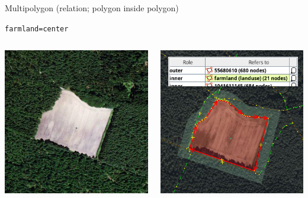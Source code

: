 \documentclass{beamer}
\begin{document}
			\begin{frame}{Multipolygon (relation; polygon inside polygon)}
				\begin{center}
					\texttt{farmland=center}
					\vspace{0.5cm}
					\begin{columns}
						\begin{column}{4cm}
							\includegraphics[width=\linewidth]{images/multipolygon-example.png}
						\end{column}
						\begin{column}{4cm}
							\includegraphics[width=\linewidth]{images/multipolygon-josm.png}

\end{column}
\end{columns}
\end{center}
\end{frame}
\end{document}
